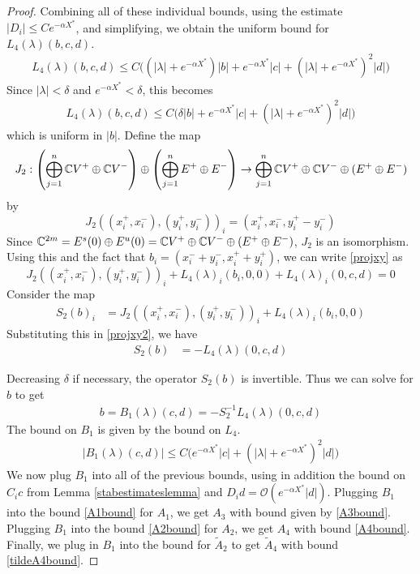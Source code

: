 \documentclass[thesis.tex]{subfiles}
\begin{document}
\begin{lemma}
\begin{proof}
Combining all of these individual bounds, using the estimate $|D_i| \leq C e^{-\alpha X^*}$, and simplifying, we obtain the uniform bound for $L_4(\lambda)(b, c, d)$.
\begin{align*}
L_4(\lambda)(b, c, d) \leq 
C\Big( (|\lambda| + e^{-\alpha X^*})|b| + e^{-\alpha X^*}|c| + (|\lambda| + e^{-\alpha X^*})^2 |d|  \Big) 
\end{align*}
Since $|\lambda| < \delta$ and $e^{-\alpha X^*} < \delta$, this becomes
\begin{align*}
L_4(\lambda)(b, c, d) \leq 
C\Big( \delta |b| + e^{-\alpha X^*}|c| + (|\lambda| + e^{-\alpha X^*})^2 |d| \Big) 
\end{align*}
which is uniform in $|b|$. Define the map
\[
J_2: \left( \bigoplus_{j=1}^n \mathbb{C} V^+ \oplus \mathbb{C} V^- \right) \oplus
\left( \bigoplus_{j=1}^n E^+ \oplus E^- \right) 
\rightarrow \bigoplus_{j=1}^n \mathbb{C} V^+ \oplus \mathbb{C} V^- \oplus (E^+ \oplus E^-)
\]
by 
\[
J_2( (x_i^+, x_i^-),(y_i^+, y_i^-))_i = ( x_i^+, x_i^-, y_i^+ - y_i^- )
\]
Since $\mathbb{C}^{2m} = E^s(0) \oplus E^u(0) = \mathbb{C} V^+ \oplus \mathbb{C} V^- \oplus (E^+ \oplus E^-)$, $J_2$ is an isomorphism. Using this and the fact that $b_i = (x_i^- + y_i^-, x_i^+ + y_i^+)$, we can write \eqref{projxy} as
\begin{equation}\label{projxy2}
J_2( (x_i^+, x_i^-),(y_i^+, y_i^-))_i 
+ L_4(\lambda)_i(b_i, 0, 0) + L_4(\lambda)_i(0, c, d) = 0
\end{equation}
Consider the map
\begin{align*}
S_2(b)_i &= J_2( (x_i^+, x_i^-),(y_i^+, y_i^-))_i 
+ L_4(\lambda)_i(b_i, 0, 0) 
\end{align*}
Substituting this in \eqref{projxy2}, we have
\begin{align*}
S_2(b) &= -L_4(\lambda)(0, c, d)
\end{align*}

Decreasing $\delta$ if necessary, the operator $S_2(b)$ is invertible. Thus we can solve for $b$ to get
\begin{align}
b = B_1(\lambda)(c,d) 
= -S_2^{-1} L_4(\lambda)(0, c, d)
\end{align}
The bound on $B_1$ is given by the bound on $L_4$.
\begin{align*}
|B_1(\lambda)(c, d)| \leq C\Big( e^{-\alpha X^*}|c| + (|\lambda| + e^{-\alpha X^*})^2 |d| \Big) 
\end{align*}
We now plug $B_1$ into all of the previous bounds, using in addition the bound on $C_i c$ from Lemma \ref{stabestimateslemma} and $D_i d = \mathcal{O}(e^{-\alpha X^*}|d|)$. Plugging $B_1$ into the bound \eqref{A1bound} for $A_1$, we get $A_3$ with bound given by \cref{A3bound}. Plugging $B_1$ into the bound \eqref{A2bound} for $A_2$, we get $A_4$ with bound \cref{A4bound}. Finally, we plug in $B_1$ into the bound for $\tilde{A}_2$ to get $\tilde{A}_4$ with bound \cref{tildeA4bound}.
\end{proof}
\end{lemma}
\end{document}

